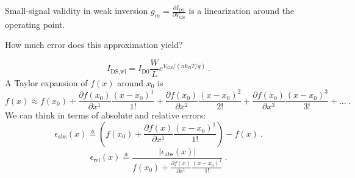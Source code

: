\documentclass[aspectratio=169, t, 9pt]{beamer} %
\begin{document}
\begin{frame}{Small-signal validity in weak inversion}
    $g_m = \frac{\partial I_\text{DS}}{\partial V_\text{GS}}$ is a linearization around the operating point.

    How much error does this approximation yield?

    \begin{equation}
        I_\text{DS,wi} = I_\text{D0} \frac{W}{L} e^{V_{GS} / \left(n k_B T / q\right)} \ .
    \end{equation}
    A Taylor expansion of $f(x)$ around $x_0$ is
    \begin{equation}
        f(x) \approx f(x_0) + \frac{\partial f(x_0)}{\partial x^1} \frac{(x - x_0)^1}{1!} + \frac{\partial f(x_0)}{\partial x^2} \frac{(x - x_0)^2}{2!} + \frac{\partial f(x_0)}{\partial x^3} \frac{(x - x_0)^3}{3!} + ... \ .
    \end{equation}
    We can think in terms of absolute and relative errors:
    \begin{equation}
        \epsilon_\text{abs} (x) \triangleq \left( f(x_0) + \frac{\partial f(x)}{\partial x^1} \frac{(x - x_0)^1}{1!} \right) - f(x) \ .
    \end{equation}
    \begin{equation}
        \epsilon_\text{rel} (x) \triangleq \frac{|\epsilon_\text{abs}(x)|}{f(x_0) + \frac{\partial f(x)}{\partial x^1} \frac{(x - x_0)^1}{1!}} \ .
    \end{equation}
\end{frame}
\end{document}
